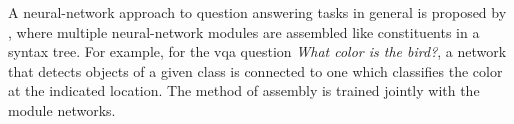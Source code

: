 A neural-network approach to question answering tasks in general is proposed by \cite{AndreasLearningComposeNeural2016}, where multiple neural-network modules are assembled like constituents in a syntax tree.
For example, for the \gls{vqa} question \textit{What color is the bird?}, a network that detects objects of a given class is connected to one which classifies the color at the indicated location.
The method of assembly is trained jointly with the module networks.


